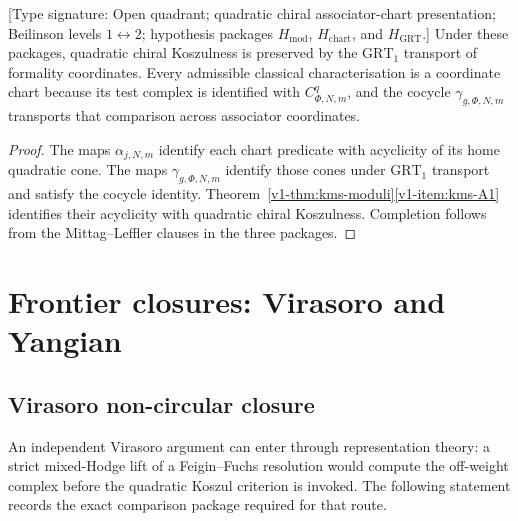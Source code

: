 \begin{theorem}
\label{v1-thm:kms-koszulness-is-grt-invariant}
\ClaimStatusConditional
\textup{[Type signature: Open quadrant; quadratic chiral
associator-chart presentation; Beilinson levels $1\leftrightarrow2$;
hypothesis packages $H_{\mathrm{mod}}$, $H_{\mathrm{chart}}$, and
$H_{\mathrm{GRT}}$.]}
Under these packages, quadratic chiral Koszulness is preserved by
the $\mathrm{GRT}_1$ transport of formality coordinates.  Every
admissible classical characterisation is a coordinate chart because
its test complex is identified with $C^q_{\Phi,N,m}$, and the
cocycle $\gamma_{g,\Phi,N,m}$ transports that comparison across
associator coordinates.
\end{theorem}

\begin{proof}
The maps $\alpha_{j,N,m}$ identify each chart predicate with
acyclicity of its home quadratic cone.  The maps
$\gamma_{g,\Phi,N,m}$ identify those cones under
$\mathrm{GRT}_1$ transport and satisfy the cocycle identity.
Theorem~\ref{v1-thm:kms-moduli}\ref{v1-item:kms-A1} identifies their
acyclicity with quadratic chiral Koszulness.  Completion follows from
the Mittag--Leffler clauses in the three packages.
\end{proof}

\section{Frontier closures: Virasoro and Yangian}
\label{v1-sec:kms-frontier-closures}

\subsection{Virasoro non-circular closure}

An independent Virasoro argument can enter through
representation theory: a strict mixed-Hodge lift of a
Feigin--Fuchs resolution would compute the off-weight complex before
the quadratic Koszul criterion is invoked.  The following statement
records the exact comparison package required for that route.

